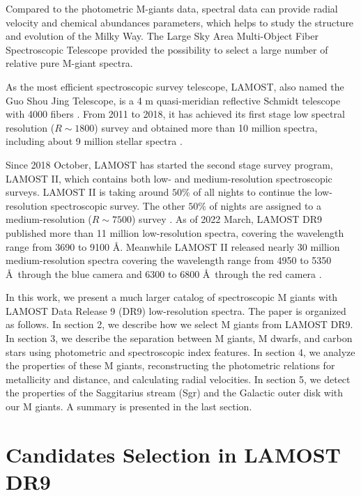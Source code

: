 \documentclass[manuscript]{aastex62}
\begin{document}
\begin{CJK*}{UTF8}{gbsn}
Compared to the photometric M-giants data, spectral data can provide radial velocity and chemical abundances parameters, which helps to study the structure and evolution of the Milky Way. The Large Sky Area Multi-Object Fiber Spectroscopic Telescope \citep[LAMOST;][]{1996ApOpt..35.5155W,Cui2012,2004ChJAA...4....1S,Luo2012,Zhao2012,2022Innov...300224Y} provided the possibility to select a large number of relative pure M-giant spectra.

As the most efficient spectroscopic survey telescope, LAMOST, also named the Guo Shou Jing Telescope, is a 4 m quasi-meridian reflective Schmidt telescope with 4000 fibers \citep{Cui2012,Luo2012,Zhao2012}. From 2011 to 2018, it has achieved its first stage low spectral resolution ($R \sim 1800$) survey and obtained more than 10 million spectra, including about 9 million stellar spectra \citep{Cui2012,2012RAA....12..735D,Luo2012,Zhao2012}.

Since 2018 October, LAMOST has started the second stage survey program, LAMOST II, which contains both low- and medium-resolution spectroscopic surveys. LAMOST II is taking around $50\%$ of all nights to continue the low-resolution spectroscopic survey. The other $50\%$ of nights are assigned to a medium-resolution ($R \sim 7500$) survey \citep{2020arXiv200507210L}. As of 2022 March, LAMOST DR9 published more than 11 million low-resolution spectra, covering the wavelength range from 3690 to 9100 \AA. Meanwhile LAMOST II released nearly 30 million medium-resolution spectra covering the wavelength range from 4950 to 5350 \AA~through the blue camera and 6300 to 6800 \AA~through the red camera \citep{2020arXiv200507210L}. 

In this work, we present a much larger catalog of spectroscopic M giants with LAMOST Data Release 9 (DR9) low-resolution spectra. The paper is organized as follows. In section 2, we describe how we select M giants from LAMOST DR9. In section 3, we describe the separation between M giants, M dwarfs, and carbon stars using photometric and spectroscopic index features. In section 4, we analyze the properties of these M giants, reconstructing the photometric relations for metallicity and distance, and calculating radial velocities. In section 5, we detect the properties of the Saggitarius stream (Sgr) and the Galactic outer disk with our M giants. A summary is presented in the last section.

\section{Candidates Selection in LAMOST DR9}

\end{CJK*}
\end{document}
